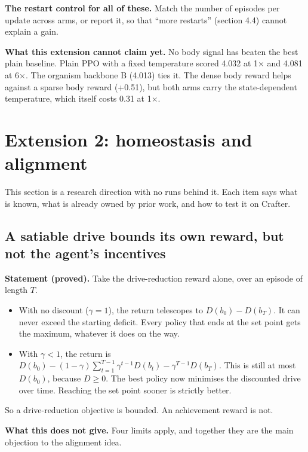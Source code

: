 \documentclass[11pt]{article}
\begin{document}
\textbf{The restart control for all of these.} Match the number of episodes per update across arms, or report it, so that ``more restarts'' (section 4.4) cannot explain a gain.

\textbf{What this extension cannot claim yet.} No body signal has beaten the best plain baseline. Plain PPO with a fixed temperature scored 4.032 at 1$\times$ and 4.081 at 6$\times$. The organism backbone B (4.013) ties it. The dense body reward helps against a sparse body reward (+0.51), but both arms carry the state-dependent temperature, which itself costs 0.31 at 1$\times$.

\section{Extension 2: homeostasis and alignment}

This section is a research direction with no runs behind it. Each item says what is known, what is already owned by prior work, and how to test it on Crafter.

\subsection{A satiable drive bounds its own reward, but not the agent's incentives}

\textbf{Statement (proved).} Take the drive-reduction reward alone, over an episode of length $T$.

\begin{itemize}
\item With no discount ($\gamma = 1$), the return telescopes to $D(b_0) - D(b_T)$. It can never exceed the starting deficit. Every policy that ends at the set point gets the maximum, whatever it does on the way.
\item With $\gamma < 1$, the return is $D(b_0) - (1 - \gamma) \sum_{t=1}^{T-1} \gamma^{t-1} D(b_t) - \gamma^{T-1} D(b_T)$. This is still at most $D(b_0)$, because $D \ge 0$. The best policy now minimises the discounted drive over time. Reaching the set point sooner is strictly better.
\end{itemize}

So a drive-reduction objective is bounded. An achievement reward is not.

\textbf{What this does not give.} Four limits apply, and together they are the main objection to the alignment idea.
\end{document}
